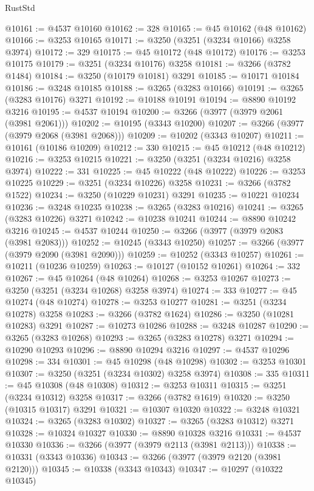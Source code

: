\begin{lexlean}{RustStd}
\begin{coremodule}
@10161 := @4537 @10160
@10162 := 328
@10165 := @45 @10162 (@48 @10162)
@10166 := @3253 @10165
@10171 := @3250 (@3251 (@3234 @10166) @3258 @3974)
@10172 := 329
@10175 := @45 @10172 (@48 @10172)
@10176 := @3253 @10175
@10179 := @3251 (@3234 @10176) @3258
@10181 := @3266 (@3782 @1484)
@10184 := @3250 (@10179 @10181) @3291
@10185 := @10171 @10184
@10186 := @3248 @10185
@10188 := @3265 (@3283 @10166)
@10191 := @3265 (@3283 @10176) @3271
@10192 := @10188 @10191
@10194 := @8890 @10192 @3216
@10195 := @4537 @10194
@10200 := @3266 (@3977 (@3979 @2061 (@3981 @2061)))
@10202 := @10195 (@3343 @10200)
@10207 := @3266 (@3977 (@3979 @2068 (@3981 @2068)))
@10209 := @10202 (@3343 @10207)
@10211 := @10161 (@10186 @10209)
@10212 := 330
@10215 := @45 @10212 (@48 @10212)
@10216 := @3253 @10215
@10221 := @3250 (@3251 (@3234 @10216) @3258 @3974)
@10222 := 331
@10225 := @45 @10222 (@48 @10222)
@10226 := @3253 @10225
@10229 := @3251 (@3234 @10226) @3258
@10231 := @3266 (@3782 @1522)
@10234 := @3250 (@10229 @10231) @3291
@10235 := @10221 @10234
@10236 := @3248 @10235
@10238 := @3265 (@3283 @10216)
@10241 := @3265 (@3283 @10226) @3271
@10242 := @10238 @10241
@10244 := @8890 @10242 @3216
@10245 := @4537 @10244
@10250 := @3266 (@3977 (@3979 @2083 (@3981 @2083)))
@10252 := @10245 (@3343 @10250)
@10257 := @3266 (@3977 (@3979 @2090 (@3981 @2090)))
@10259 := @10252 (@3343 @10257)
@10261 := @10211 (@10236 @10259)
@10263 := @10127 (@10152 @10261)
@10264 := 332
@10267 := @45 @10264 (@48 @10264)
@10268 := @3253 @10267
@10273 := @3250 (@3251 (@3234 @10268) @3258 @3974)
@10274 := 333
@10277 := @45 @10274 (@48 @10274)
@10278 := @3253 @10277
@10281 := @3251 (@3234 @10278) @3258
@10283 := @3266 (@3782 @1624)
@10286 := @3250 (@10281 @10283) @3291
@10287 := @10273 @10286
@10288 := @3248 @10287
@10290 := @3265 (@3283 @10268)
@10293 := @3265 (@3283 @10278) @3271
@10294 := @10290 @10293
@10296 := @8890 @10294 @3216
@10297 := @4537 @10296
@10298 := 334
@10301 := @45 @10298 (@48 @10298)
@10302 := @3253 @10301
@10307 := @3250 (@3251 (@3234 @10302) @3258 @3974)
@10308 := 335
@10311 := @45 @10308 (@48 @10308)
@10312 := @3253 @10311
@10315 := @3251 (@3234 @10312) @3258
@10317 := @3266 (@3782 @1619)
@10320 := @3250 (@10315 @10317) @3291
@10321 := @10307 @10320
@10322 := @3248 @10321
@10324 := @3265 (@3283 @10302)
@10327 := @3265 (@3283 @10312) @3271
@10328 := @10324 @10327
@10330 := @8890 @10328 @3216
@10331 := @4537 @10330
@10336 := @3266 (@3977 (@3979 @2113 (@3981 @2113)))
@10338 := @10331 (@3343 @10336)
@10343 := @3266 (@3977 (@3979 @2120 (@3981 @2120)))
@10345 := @10338 (@3343 @10343)
@10347 := @10297 (@10322 @10345)

\end{coremodule}
\end{lexlean}
